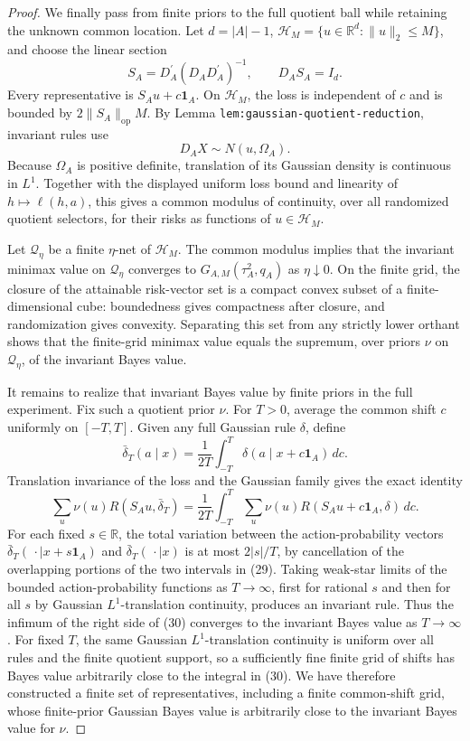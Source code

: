 \documentclass{article}
\begin{document}
\begin{proof}
We finally pass from finite priors to the full quotient ball while retaining the unknown common location.  Let \(d=|A|-1\), \(\mathcal H_M=\{u\in\mathbb R^d:\lVert u\rVert_2\leq M\}\), and choose the linear section
\[
S_A=D_A^{\prime}(D_AD_A^{\prime})^{-1},
\qquad D_AS_A=I_d.
\tag{27}
\]
Every representative is \(S_Au+c\mathbf1_A\).  On \(\mathcal H_M\), the loss is independent of \(c\) and is bounded by \(2\lVert S_A\rVert_{\mathrm{op}}M\).  By Lemma \texttt{lem:gaussian-quotient-reduction}, invariant rules use
\[
D_AX\sim N(u,\Omega_A).
\tag{28}
\]
Because \(\Omega_A\) is positive definite, translation of its Gaussian density is continuous in \(L^1\).  Together with the displayed uniform loss bound and linearity of \(h\mapsto\ell(h,a)\), this gives a common modulus of continuity, over all randomized quotient selectors, for their risks as functions of \(u\in\mathcal H_M\).

Let \(\mathcal Q_\eta\) be a finite \(\eta\)-net of \(\mathcal H_M\).  The common modulus implies that the invariant minimax value on \(\mathcal Q_\eta\) converges to \(G_{A,M}(\tau_A^2,q_A)\) as \(\eta\downarrow0\).  On the finite grid, the closure of the attainable risk-vector set is a compact convex subset of a finite-dimensional cube: boundedness gives compactness after closure, and randomization gives convexity.  Separating this set from any strictly lower orthant shows that the finite-grid minimax value equals the supremum, over priors \(\nu\) on \(\mathcal Q_\eta\), of the invariant Bayes value.

It remains to realize that invariant Bayes value by finite priors in the full experiment.  Fix such a quotient prior \(\nu\).  For \(T>0\), average the common shift \(c\) uniformly on \([-T,T]\).  Given any full Gaussian rule \(\delta\), define
\[
\bar\delta_T(a\mid x)=\frac1{2T}\int_{-T}^T
\delta(a\mid x+c\mathbf1_A)\,dc.
\tag{29}
\]
Translation invariance of the loss and the Gaussian family gives the exact identity
\[
\sum_{u}\nu(u)R(S_Au,\bar\delta_T)
=\frac1{2T}\int_{-T}^T\sum_u\nu(u)
R(S_Au+c\mathbf1_A,\delta)\,dc.
\tag{30}
\]
For each fixed \(s\in\mathbb R\), the total variation between the action-probability vectors \(\bar\delta_T(\,\cdot\mid x+s\mathbf1_A)\) and \(\bar\delta_T(\,\cdot\mid x)\) is at most \(2|s|/T\), by cancellation of the overlapping portions of the two intervals in (29).  Taking weak-star limits of the bounded action-probability functions as \(T\to\infty\), first for rational \(s\) and then for all \(s\) by Gaussian \(L^1\)-translation continuity, produces an invariant rule.  Thus the infimum of the right side of (30) converges to the invariant Bayes value as \(T\to\infty\).  For fixed \(T\), the same Gaussian \(L^1\)-translation continuity is uniform over all rules and the finite quotient support, so a sufficiently fine finite grid of shifts has Bayes value arbitrarily close to the integral in (30).  We have therefore constructed a finite set of representatives, including a finite common-shift grid, whose finite-prior Gaussian Bayes value is arbitrarily close to the invariant Bayes value for \(\nu\).


\end{proof}
\end{document}
